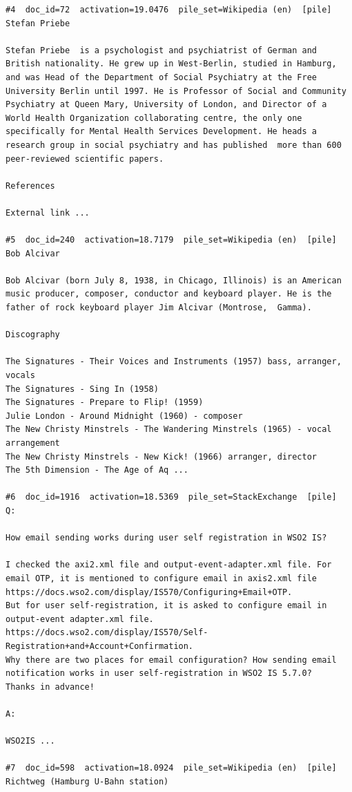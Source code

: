 \begin{verbatim}
#4  doc_id=72  activation=19.0476  pile_set=Wikipedia (en)  [pile]
Stefan Priebe

Stefan Priebe  is a psychologist and psychiatrist of German and British nationality. He grew up in West-Berlin, studied in Hamburg, and was Head of the Department of Social Psychiatry at the Free University Berlin until 1997. He is Professor of Social and Community Psychiatry at Queen Mary, University of London, and Director of a World Health Organization collaborating centre, the only one specifically for Mental Health Services Development. He heads a research group in social psychiatry and has published  more than 600 peer-reviewed scientific papers.

References

External link ...

#5  doc_id=240  activation=18.7179  pile_set=Wikipedia (en)  [pile]
Bob Alcivar

Bob Alcivar (born July 8, 1938, in Chicago, Illinois) is an American music producer, composer, conductor and keyboard player. He is the father of rock keyboard player Jim Alcivar (Montrose,  Gamma).

Discography

The Signatures - Their Voices and Instruments (1957) bass, arranger, vocals
The Signatures - Sing In (1958)
The Signatures - Prepare to Flip! (1959)
Julie London - Around Midnight (1960) - composer
The New Christy Minstrels - The Wandering Minstrels (1965) - vocal arrangement
The New Christy Minstrels - New Kick! (1966) arranger, director
The 5th Dimension - The Age of Aq ...

#6  doc_id=1916  activation=18.5369  pile_set=StackExchange  [pile]
Q:

How email sending works during user self registration in WSO2 IS?

I checked the axi2.xml file and output-event-adapter.xml file. For email OTP, it is mentioned to configure email in axis2.xml file https://docs.wso2.com/display/IS570/Configuring+Email+OTP.
But for user self-registration, it is asked to configure email in output-event adapter.xml file.
https://docs.wso2.com/display/IS570/Self-Registration+and+Account+Confirmation.
Why there are two places for email configuration? How sending email notification works in user self-registration in WSO2 IS 5.7.0?
Thanks in advance!

A:

WSO2IS ...

#7  doc_id=598  activation=18.0924  pile_set=Wikipedia (en)  [pile]
Richtweg (Hamburg U-Bahn station)


\end{verbatim}
